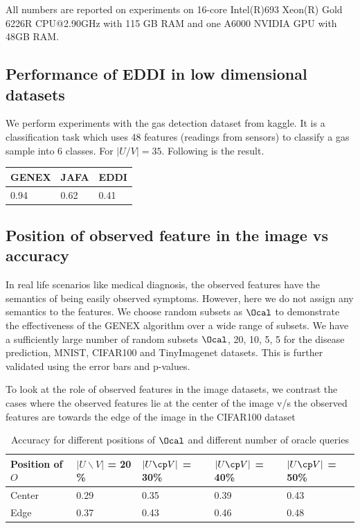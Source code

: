 \documentclass[letterpaper]{article}
\begin{document}
All numbers are reported on experiments on 16-core Intel(R)693
Xeon(R) Gold 6226R CPU@2.90GHz with 115 GB RAM and one A6000 NVIDIA GPU with 48GB RAM.

\subsection{Performance of EDDI in low dimensional datasets}

{We perform experiments with the gas detection dataset from kaggle. It is a classification task which uses 48 features (readings from sensors) to classify a gas sample into 6 classes.} For $|U/V|=35$. Following is the result.

\begin{table}[!ht]
    \centering
    \begin{tabular}{|l|l|l|}
    \hline
        GENEX & JAFA & EDDI \\ \hline
        0.94 & 0.62 & 0.41 \\ \hline
    \end{tabular}
\end{table}

\subsection{Position of observed feature in the image vs accuracy}

 In real life scenarios like medical diagnosis, the observed features have the semantics of being easily observed symptoms. However, here we do not assign any semantics to the features. We choose random subsets as $\Ocal$ to demonstrate the effectiveness of the GENEX algorithm over a wide range of subsets. We have a sufficiently large number of random subsets $\Ocal$, 20, 10, 5, 5 for the disease prediction, MNIST, CIFAR100 and TinyImagenet datasets. This is further validated using the error bars and p-values.

To look at the role of observed features in the image datasets, we contrast the cases where the observed features lie at the center of the image v/s the observed features are towards the edge of the image in the CIFAR100 dataset

\begin{table}[!ht]
    \centering
    \begin{tabular}{|l|l|l|l|l|}
    \hline
        Position of $O$ &  $|U \backslash V|$ = 20 \% &$|U\cp V|$ = 30\% &$|U\cp V|$ = 40\% &$|U\cp V|$ = 50\% \\ \hline
        Center & 0.29 & 0.35 & 0.39 & 0.43 \\ \hline
        Edge & 0.37 & 0.43 & 0.46 & 0.48 \\ \hline
    \end{tabular}
    \caption{Accuracy for different positions of $\Ocal$ and different number of oracle queries}
\end{table}
\end{document}
